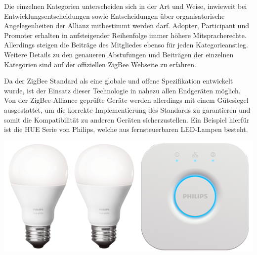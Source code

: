 \begin{multicols}{3}


Die einzelnen Kategorien unterscheiden sich in der Art und Weise, inwieweit bei Entwicklungsentscheidungen sowie Entscheidungen über organisatorische Angelegenheiten der Allianz mitbestimmt werden darf. Adopter, Participant und Promoter erhalten in aufsteigender Reihenfolge immer höhere Mitspracherechte. Allerdings steigen die Beiträge des Mitgliedes ebenso für jeden Kategorieanstieg.~\cite{zigbee.11} Weitere Details zu den genaueren Abstufungen und Beiträgen der einzelnen Kategorien sind auf der offiziellen ZigBee Webseite zu erfahren.
\par Da der ZigBee Standard als eine globale und offene Spezifikation entwickelt wurde, ist der Einsatz dieser Technologie in nahezu allen Endgeräten möglich. Von der ZigBee-Alliance  geprüfte Geräte werden allerdings mit einem Gütesiegel ausgestattet, um die korrekte Implementierung des Standards zu garantieren und somit die Kompatibilität zu anderen Geräten sicherzustellen. Ein Beispiel hierfür ist die HUE Serie von Philips, welche aus fernsteuerbaren LED-Lampen besteht.
\begin{Figure}
\includegraphics[width=\linewidth]{Kapitel/ZigBee/Grafiken/hue.png}
\end{Figure}


\end{multicols}
